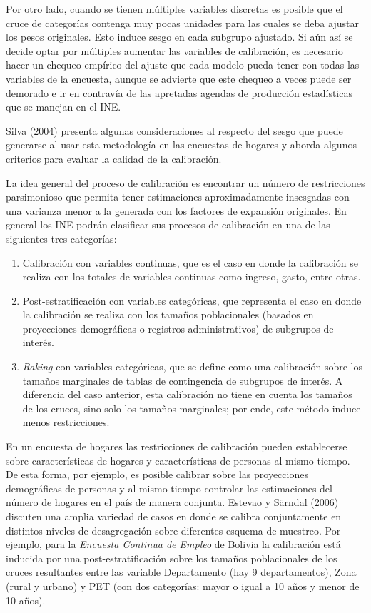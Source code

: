 \documentclass[
  12pt,
  spanish,
]{book}
\providecommand{\tightlist}{%
  \setlength{\itemsep}{0pt}\setlength{\parskip}{0pt}}
\begin{document}
Por otro lado, cuando se tienen múltiples variables discretas es posible que el cruce de categorías contenga muy pocas unidades para las cuales se deba ajustar los pesos originales. Esto induce sesgo en cada subgrupo ajustado. Si aún así se decide optar por múltiples aumentar las variables de calibración, es necesario hacer un chequeo empírico del ajuste que cada modelo pueda tener con todas las variables de la encuesta, aunque se advierte que este chequeo a veces puede ser demorado e ir en contravía de las apretadas agendas de producción estadísticas que se manejan en el INE.

\protect\hyperlink{ref-Silva_2004}{Silva} (\protect\hyperlink{ref-Silva_2004}{2004}) presenta algunas consideraciones al respecto del sesgo que puede generarse al usar esta metodología en las encuestas de hogares y aborda algunos criterios para evaluar la calidad de la calibración.

La idea general del proceso de calibración es encontrar un número de restricciones parsimonioso que permita tener estimaciones aproximadamente insesgadas con una varianza menor a la generada con los factores de expansión originales. En general los INE podrán clasificar sus procesos de calibración en una de las siguientes tres categorías:

\begin{enumerate}
\def\labelenumi{\arabic{enumi}.}
\tightlist
\item
  Calibración con variables continuas, que es el caso en donde la calibración se realiza con los totales de variables continuas como ingreso, gasto, entre otras.
\item
  Post-estratificación con variables categóricas, que representa el caso en donde la calibración se realiza con los tamaños poblacionales (basados en proyecciones demográficas o registros administrativos) de subgrupos de interés.
\item
  \emph{Raking} con variables categóricas, que se define como una calibración sobre los tamaños marginales de tablas de contingencia de subgrupos de interés. A diferencia del caso anterior, esta calibración no tiene en cuenta los tamaños de los cruces, sino solo los tamaños marginales; por ende, este método induce menos restricciones.
\end{enumerate}

En un encuesta de hogares las restricciones de calibración pueden establecerse sobre características de hogares y características de personas al mismo tiempo. De esta forma, por ejemplo, es posible calibrar sobre las proyecciones demográficas de personas y al mismo tiempo controlar las estimaciones del número de hogares en el país de manera conjunta. \protect\hyperlink{ref-Estevao_Sarndal_2006}{Estevao y Särndal} (\protect\hyperlink{ref-Estevao_Sarndal_2006}{2006}) discuten una amplia variedad de casos en donde se calibra conjuntamente en distintos niveles de desagregación sobre diferentes esquema de muestreo. Por ejemplo, para la \emph{Encuesta Continua de Empleo} de Bolivia la calibración está inducida por una post-estratificación sobre los tamaños poblacionales de los cruces resultantes entre las variable Departamento (hay 9 departamentos), Zona (rural y urbano) y PET (con dos categorías: mayor o igual a 10 años y menor de 10 años).
\end{document}
